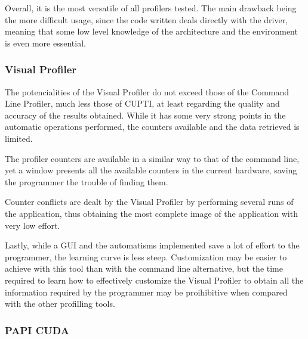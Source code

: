 Overall, it is the most versatile of all profilers tested. The main drawback being the more difficult usage, since the code written deals directly with the driver, meaning that some low level knowledge of the architecture and the environment is even more essential.

\subsubsection{Visual Profiler}
\label{sec:533}

The potencialities of the Visual Profiler do not exceed those of the Command Line Profiler, much less those of CUPTI, at least regarding the quality and accuracy of the results obtained. While it has some very strong points in the automatic operations performed, the counters available and the data retrieved is limited.

The profiler counters are available in a similar way to that of the command line, yet a window presents all the available counters in the current hardware, saving the programmer the trouble of finding them.

Counter conflicts are dealt by the Visual Profiler by performing several runs of the application, thus obtaining the most complete image of the application with very low effort.

Lastly, while a GUI and the automatisms implemented save a lot of effort to the programmer, the learning curve is less steep. Customization may be easier to achieve with this tool than with the command line alternative, but the time required to learn how to effectively customize the Visual Profiler to obtain all the information required by the programmer may be proihibitive when compared with the other profilling tools.

\subsubsection{PAPI CUDA}
\label{sec:534}

